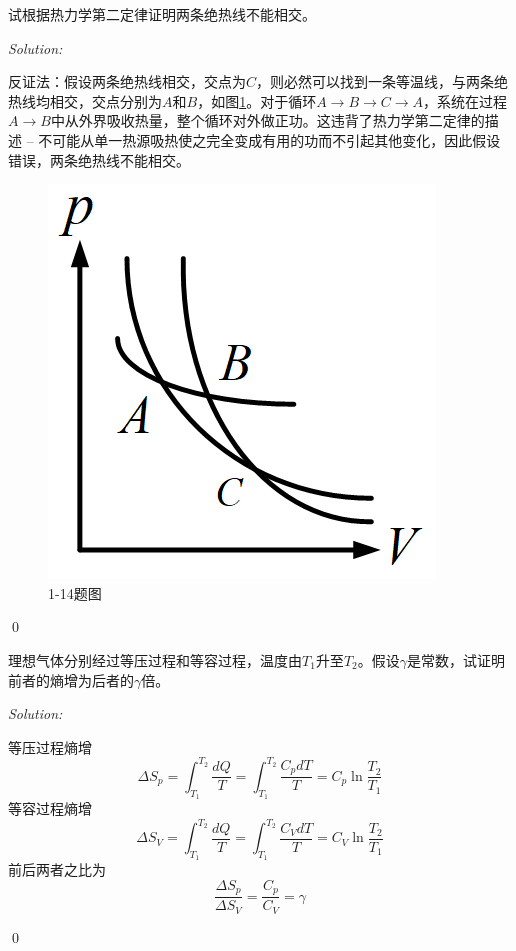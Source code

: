 \documentclass[12pt,a4paper]{article}
\newenvironment{problem}[2][Problem]{\begin{trivlist}
\item[\hskip \labelsep {\bfseries #1}\hskip \labelsep {\bfseries #2.}]}{\end{trivlist}}
\newenvironment{sol}
    {\emph{Solution:}
    }
    {
    \qed
    }
\begin{document}
\begin{problem}{1-14}
试根据热力学第二定律证明两条绝热线不能相交。
\end{problem}
\begin{sol}
反证法：假设两条绝热线相交，交点为$C$，则必然可以找到一条等温线，与两条绝热线均相交，交点分别为$A$和$B$，如图\ref{Homework_1_1_14}。对于循环$A\rightarrow B\rightarrow C\rightarrow A$，系统在过程$A\rightarrow B$中从外界吸收热量，整个循环对外做正功。这违背了热力学第二定律的描述 -- 不可能从单一热源吸热使之完全变成有用的功而不引起其他变化，因此假设错误，两条绝热线不能相交。
\begin{figure}[h]
\centering
\includegraphics[scale=0.5]{Homework_1_1-14.png}
\caption{1-14题图} \label{Homework_1_1_14}
\end{figure}
\end{sol}

\begin{problem}{1-16}
理想气体分别经过等压过程和等容过程，温度由$T_1$升至$T_2$。假设$\gamma$是常数，试证明前者的熵增为后者的$\gamma$倍。
\end{problem}
\begin{sol}
等压过程熵增
\begin{equation}
\Delta S_p=\int_{T_1}^{T_2}\frac{dQ}{T}=\int_{T_1}^{T_2}\frac{C_pdT}{T}=C_p\ln\frac{T_2}{T_1}
\end{equation}
等容过程熵增
\begin{equation}
\Delta S_V=\int_{T_1}^{T_2}\frac{dQ}{T}=\int_{T_1}^{T_2}\frac{C_VdT}{T}=C_V\ln\frac{T_2}{T_1}
\end{equation}
前后两者之比为
\begin{equation}
\frac{\Delta S_p}{\Delta S_V}=\frac{C_p}{C_V}=\gamma
\end{equation}
\end{sol}
\end{document}

